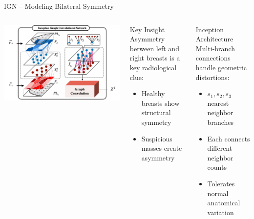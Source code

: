 \documentclass[8pt,aspectratio=169,xcolor=dvipsnames]{beamer}
\begin{document}
\begin{frame}{IGN – Modeling Bilateral Symmetry}
    \begin{columns}
        \includegraphics[width=\linewidth]{ign.png}
        
        \begin{block}{Key Insight}
        Asymmetry between left and right breasts is a key radiological clue:
        \begin{itemize}
            \item Healthy breasts show structural symmetry
            \item Suspicious masses create asymmetry
        \end{itemize}
        \end{block}
        
        \begin{alertblock}{Inception Architecture}
        Multi-branch connections handle geometric distortions:
        \begin{itemize}
            \item $s_1, s_2, s_3$ nearest neighbor branches
            \item Each connects different neighbor counts
            \item Tolerates normal anatomical variation
        \end{itemize}
        \end{alertblock}
    \end{columns}
\end{frame}
\end{document}
